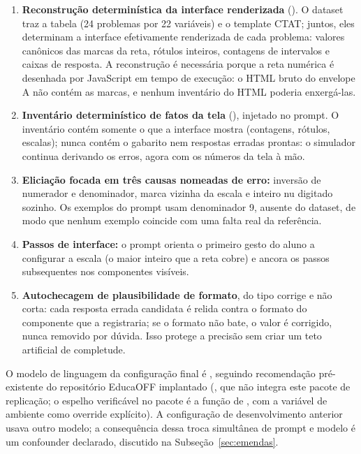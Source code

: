 \documentclass[11pt,a4paper]{article}
\begin{document}
\begin{enumerate}
  \item \textbf{Reconstrução determinística da interface renderizada} (). O dataset traz a tabela  (24 problemas por 22 variáveis) e o template CTAT; juntos, eles determinam a interface efetivamente renderizada de cada problema: valores canônicos das marcas da reta, rótulos inteiros, contagens de intervalos e caixas de resposta. A reconstrução é necessária porque a reta numérica é desenhada por JavaScript em tempo de execução: o HTML bruto do envelope A não contém as marcas, e nenhum inventário do HTML poderia enxergá-las.
  \item \textbf{Inventário determinístico de fatos da tela} (), injetado no prompt. O inventário contém somente o que a interface mostra (contagens, rótulos, escalas); nunca contém o gabarito nem respostas erradas prontas: o simulador continua derivando os erros, agora com os números da tela à mão.
  \item \textbf{Eliciação focada em três causas nomeadas de erro:} inversão de numerador e denominador, marca vizinha da escala e inteiro nu digitado sozinho. Os exemplos do prompt usam denominador 9, ausente do dataset, de modo que nenhum exemplo coincide com uma falta real da referência.
  \item \textbf{Passos de interface:} o prompt orienta o primeiro gesto do aluno a configurar a escala (o maior inteiro que a reta cobre) e ancora os passos subsequentes nos componentes visíveis.
  \item \textbf{Autochecagem de plausibilidade de formato}, do tipo corrige e não corta: cada resposta errada candidata é relida contra o formato do componente que a registraria; se o formato não bate, o valor é corrigido, nunca removido por dúvida. Isso protege a precisão sem criar um teto artificial de completude.
\end{enumerate}

O modelo de linguagem da configuração final é , seguindo recomendação pré-existente do repositório EducaOFF implantado (, que não integra este pacote de replicação; o espelho verificável no pacote é a função  de , com a variável de ambiente  como override explícito). A configuração de desenvolvimento anterior usava outro modelo; a consequência dessa troca simultânea de prompt e modelo é um confounder declarado, discutido na Subseção~\ref{sec:emendas}.
\end{document}
